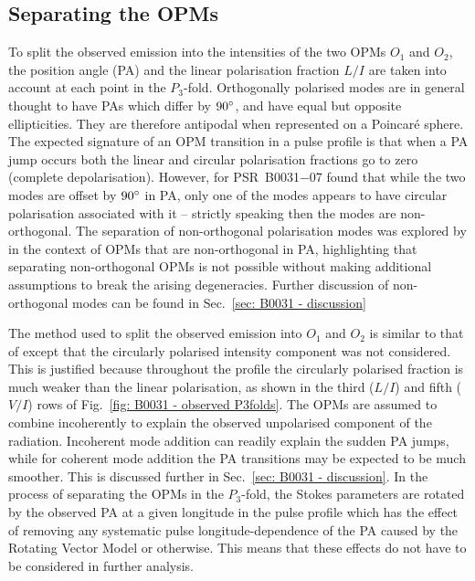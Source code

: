 





\subsection{Separating the OPMs}
\label{sec: B0031 - methods - mode separation}

To split the observed emission into the intensities of the two OPMs $O_1$ and $O_2$, the position angle (PA) and the linear polarisation fraction $L/I$ are taken into account at each point in the $P_3$-fold. Orthogonally polarised modes are in general thought to have PAs which differ by $90^\circ$, and have equal but opposite ellipticities. They are therefore antipodal when represented on a Poincar\'e sphere. The expected signature of an OPM transition in a pulse profile is that when a PA jump occurs both the linear and circular polarisation fractions go to zero (complete depolarisation). However, for PSR~B0031$-$07 \citet{IWJ+2020} found that while the two modes are offset by $90^\circ$ in PA, only one of the modes appears to have circular polarisation associated with it -- strictly speaking then the modes are non-orthogonal. The separation of non-orthogonal polarisation modes was explored by \citet{Mxxx2003} in the context of OPMs that are non-orthogonal in PA, highlighting that separating non-orthogonal OPMs is not possible without making additional assumptions to break the arising degeneracies. Further discussion of non-orthogonal modes can be found in Sec.~\ref{sec: B0031 - discussion}

The method used to split the observed emission into $O_1$ and $O_2$ is similar to that of \citet{MSxx2000} except that the circularly polarised intensity component was not considered. This is justified because throughout the profile the circularly polarised fraction is much weaker than the linear polarisation, as shown in the third ($L/I$) and fifth ($V/I$) rows of Fig.~\ref{fig: B0031 - observed P3folds}. The OPMs are assumed to combine incoherently to explain the observed unpolarised component of the radiation. Incoherent mode addition can readily explain the sudden PA jumps, while for coherent mode addition the PA transitions may be expected to be much smoother. This is discussed further in Sec.~\ref{sec: B0031 - discussion}. In the process of separating the OPMs in the $P_3$-fold, the Stokes parameters are rotated by the observed PA at a given longitude in the pulse profile which has the effect of removing any systematic pulse longitude-dependence of the PA caused by the Rotating Vector Model or otherwise. This means that these effects do not have to be considered in further analysis.

